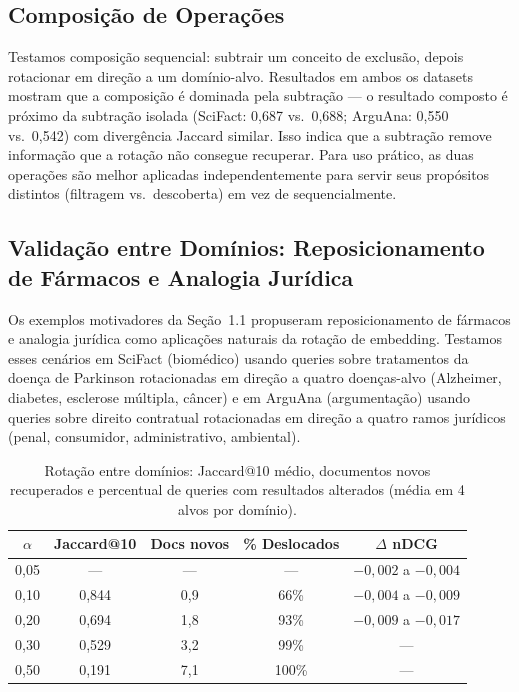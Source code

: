 \documentclass{article}
\begin{document}
\subsection{Composição de Operações}

Testamos composição sequencial: subtrair um conceito de exclusão, depois rotacionar em direção a um domínio-alvo. Resultados em ambos os datasets mostram que a composição é dominada pela subtração --- o resultado composto é próximo da subtração isolada (SciFact: 0,687 vs.\ 0,688; ArguAna: 0,550 vs.\ 0,542) com divergência Jaccard similar. Isso indica que a subtração remove informação que a rotação não consegue recuperar. Para uso prático, as duas operações são melhor aplicadas independentemente para servir seus propósitos distintos (filtragem vs.\ descoberta) em vez de sequencialmente.

\subsection{Validação entre Domínios: Reposicionamento de Fármacos e Analogia Jurídica}

Os exemplos motivadores da Seção~1.1 propuseram reposicionamento de fármacos e analogia jurídica como aplicações naturais da rotação de embedding. Testamos esses cenários em SciFact (biomédico) usando queries sobre tratamentos da doença de Parkinson rotacionadas em direção a quatro doenças-alvo (Alzheimer, diabetes, esclerose múltipla, câncer) e em ArguAna (argumentação) usando queries sobre direito contratual rotacionadas em direção a quatro ramos jurídicos (penal, consumidor, administrativo, ambiental).

\begin{table}[ht]
\centering
\caption{Rotação entre domínios: Jaccard@10 médio, documentos novos recuperados e percentual de queries com resultados alterados (média em 4 alvos por domínio).}
\label{tab:crossdomain}
\begin{tabular}{ccccc}
\toprule
$\alpha$ & Jaccard@10 & Docs novos & \% Deslocados & $\Delta$ nDCG \\
\midrule
0,05 & --- & --- & --- & $-0{,}002$ a $-0{,}004$ \\
0,10 & 0,844 & 0,9 & 66\% & $-0{,}004$ a $-0{,}009$ \\
0,20 & 0,694 & 1,8 & 93\% & $-0{,}009$ a $-0{,}017$ \\
0,30 & 0,529 & 3,2 & 99\% & --- \\
0,50 & 0,191 & 7,1 & 100\% & --- \\
\bottomrule
\end{tabular}
\end{table}
\end{document}
